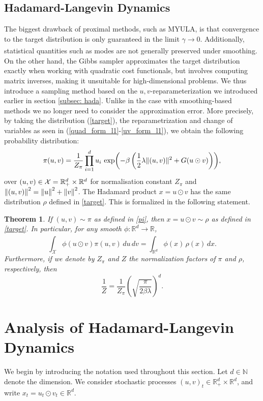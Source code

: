 \documentclass[11pt, twoside]{report}
\newtheorem{theorem}{Theorem}[section]
\begin{document}
\section{Hadamard-Langevin Dynamics}
The biggest drawback of proximal methods, such as MYULA, is that convergence to the target distribution is only guaranteed in the limit $\gamma \xrightarrow[]{} 0$. Additionally, statistical quantities such as modes are not generally preserved under smoothing. On the other hand, the Gibbs sampler approximates the target distribution exactly when working with quadratic cost functionals, but involves computing matrix inverses, making it unsuitable for high-dimensional problems. We thus introduce a sampling method based on the $u,v$-reparameterization we introduced earlier in section \ref{subsec: hada}. Unlike in the case with smoothing-based methods we no longer need to consider the approximation error. More precisely, by taking the distribution (\ref{target}), the reparametrization and change of variables as seen in (\ref{quad_form_l1}-\ref{uv_form_l1}), we obtain the following probability distribution:
\begin{align}
\pi(u,v)=\frac{1}{Z_\pi} \prod_{i=1}^d  u_i\, \exp\pp{-\beta\, \pp{\frac12\lambda \|(u,v)\|^2+G(u\odot v)} },\label{pi}
\end{align}
over $(u,v)\in \mathcal X= \mathbb{R}_+^d\times \mathbb {R}^d$ for normalisation constant $Z_\pi$ and $\left\lVert(u,v)\right\rVert^2=\left\lVert u\right\rVert^2+\left\lVert v\right\rVert^2$. The Hadamard  product $x=u\odot v$ has the same distribution $\rho$ defined in \eqref{target}. This is formalized in the following statement.





\begin{theorem}\label{thm:overparam}If $(u,v)\sim \pi$ as defined in \eqref{pi}, then $x=u \odot v\sim\rho$ as defined in \eqref{target}. In particular, for any smooth $\phi:\mathbb{R}^d \xrightarrow[]{} \mathbb{R}$,
    \[\int_{\mathcal X} \phi(u \odot v) \pi(u,v)\,du\,dv = \int_{\mathbb{R}^
    d} \phi(x) \,\rho(x)\,dx.\]
    Furthermore, if we denote by $Z_\pi$ and $Z$ the normalization factors of $\pi$ and $\rho$, respectively, then
    \[\frac{1}{Z} = \frac{1}{Z_\pi} \left(\sqrt{\frac{\pi}{2\beta \lambda}}\right)^d.\]
\end{theorem}

\chapter{Analysis of Hadamard-Langevin Dynamics} \label{chp:analysis_hada_lang}
We begin by introducing the notation used throughout this section. Let $d\in\mathbb N$ denote the dimension. We consider stochastic processes $(u,v)_t\in \mathbb R_+^d \times \mathbb R^d$, and write $x_t = u_t \odot v_t \in \mathbb R^d$.
\end{document}
